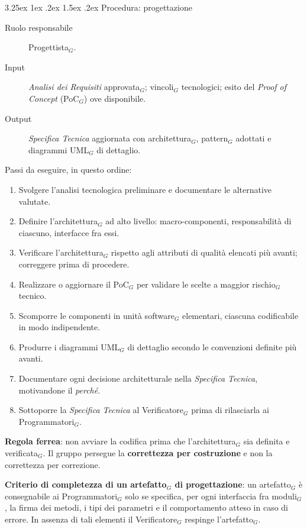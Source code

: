 \documentclass[a4paper, 10pt]{article}
\makeatletter
\renewcommand\paragraph{\@startsection{paragraph}{4}{\z@}%
  {3.25ex \@plus1ex \@minus .2ex}%
  {1.5ex \@plus .2ex}%
  {\normalfont\normalsize\bfseries}}
\makeatother
\begin{document}
\paragraph{Procedura: progettazione}

\begin{description}
    \item[Ruolo responsabile] Progettista$_G$.
    \item[Input] \textit{Analisi dei Requisiti} approvata$_G$; vincoli$_G$ tecnologici; esito del \textit{Proof of Concept} (PoC$_G$) ove disponibile.
    \item[Output] \textit{Specifica Tecnica} aggiornata con architettura$_G$, pattern$_G$ adottati e diagrammi UML$_G$ di dettaglio.
\end{description}

\noindent Passi da eseguire, in questo ordine:
\begin{enumerate}
    \item Svolgere l'analisi tecnologica preliminare e documentare le alternative valutate.
    \item Definire l'architettura$_G$ ad alto livello: macro-componenti, responsabilità di ciascuno, interfacce fra essi.
    \item Verificare l'architettura$_G$ rispetto agli attributi di qualità elencati più avanti; correggere prima di procedere.
    \item Realizzare o aggiornare il PoC$_G$ per validare le scelte a maggior rischio$_G$ tecnico.
    \item Scomporre le componenti in unità software$_G$ elementari, ciascuna codificabile in modo indipendente.
    \item Produrre i diagrammi UML$_G$ di dettaglio secondo le convenzioni definite più avanti.
    \item Documentare ogni decisione architetturale nella \textit{Specifica Tecnica}, motivandone il \emph{perché}.
    \item Sottoporre la \textit{Specifica Tecnica} al Verificatore$_G$ prima di rilasciarla ai Programmatori$_G$.
\end{enumerate}

\noindent \textbf{Regola ferrea}: non avviare la codifica prima che l'architettura$_G$ sia definita e verificata$_G$. Il gruppo persegue la \textbf{correttezza per costruzione} e non la correttezza per correzione.

\noindent \textbf{Criterio di completezza di un artefatto$_G$ di progettazione}: un artefatto$_G$ è consegnabile ai Programmatori$_G$ solo se specifica, per ogni interfaccia fra moduli$_G$, la firma dei metodi, i tipi dei parametri e il comportamento atteso in caso di errore. In assenza di tali elementi il Verificatore$_G$ respinge l'artefatto$_G$.
\end{document}
